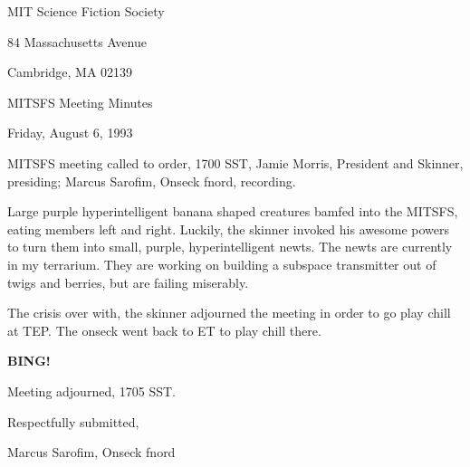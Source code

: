 \documentclass[12pt]{article}
\newcommand{\bing}{{\bf BING!} }
\begin{document}
\begin{center}

MIT Science Fiction Society 

84 Massachusetts Avenue

Cambridge, MA 02139

\vspace{12pt}

MITSFS Meeting Minutes 

Friday, August 6, 1993

\end{center}
 
\vspace{18pt}

\setlength{\parskip}{6pt}

\noindent
MITSFS meeting called to order, 1700 SST,
Jamie Morris, President and Skinner, presiding; Marcus Sarofim, Onseck fnord, recording.

Large purple hyperintelligent banana shaped creatures bamfed into the MITSFS, eating members left and right. Luckily, the skinner invoked his awesome powers to turn them into small, purple, hyperintelligent newts. The newts are currently in my terrarium. They are working on building a subspace transmitter out of twigs and berries, but are failing miserably.

The crisis over with, the skinner adjourned the meeting in order to go play chill at TEP. The onseck went back to ET to play chill there.

\bing

\vspace{12pt}

\noindent
Meeting adjourned, 1705 SST.

\vspace{18pt}

\centerline{Respectfully submitted,}
\centerline{Marcus Sarofim, Onseck fnord}
\end{document}
